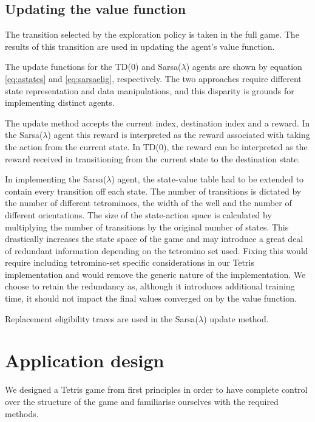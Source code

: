 \documentclass{rucsthesis}
\begin{document}
\subsection{Updating the value function}

The transition selected by the exploration policy is taken in the full game. The results of this transition are used in updating the agent's value function.

The update functions for the TD(0) and Sarsa($\lambda$) agents are shown by equation \ref{eq:astates} and \ref{eq:sarsaelig}, respectively. The two approaches require different state representation and data manipulations, and this disparity is grounds for implementing distinct agents. 

The update method accepts the current index, destination index and a reward. In the Sarsa($\lambda$) agent this reward is interpreted as the reward associated with taking the action from the current state. In TD(0), the reward can be interpreted as the reward received in transitioning from the current state to the destination state.

In implementing the Sarsa($\lambda$) agent, the state-value table had to be extended to contain every transition off each state. The number of transitions is dictated by the number of different tetrominoes, the width of the well and the number of different orientations.  The size of the state-action space is calculated by multiplying the number of transitions by the original number of states. This drastically increases the state space of the game and may introduce a great deal of redundant information depending on the tetromino set used. Fixing this would require including tetromino-set specific considerations in our Tetris implementation and would remove the generic nature of the implementation. We choose to retain the redundancy as, although it introduces additional training time, it should not impact the final values converged on by the value function.

Replacement eligibility traces are used in the Sarsa($\lambda$) update method. 

\section{Application design}

We designed a Tetris game from first principles in order to have complete control over the structure of the game and familiarise ourselves with the required methods.
\end{document}
